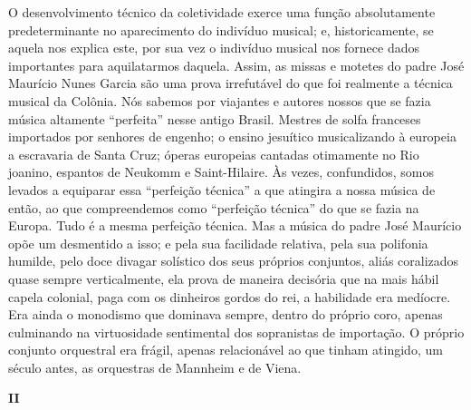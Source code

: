O desenvolvimento técnico da coletividade exerce uma função
absolutamente predeterminante no aparecimento do indivíduo musical; e,
historicamente, se aquela nos explica este, por sua vez o indivíduo
musical nos fornece dados importantes para aquilatarmos daquela. Assim,
as missas e motetes do padre José Maurício Nunes Garcia são uma prova
irrefutável do que foi realmente a técnica musical da Colônia. Nós
sabemos por viajantes e autores nossos que se fazia música altamente
``perfeita'' nesse antigo Brasil. Mestres de solfa franceses importados
por senhores de engenho; o ensino jesuítico musicalizando à europeia a
escravaria de Santa Cruz; óperas europeias cantadas otimamente no Rio
joanino, espantos de Neukomm e Saint-Hilaire. Às vezes, confundidos,
somos levados a equiparar essa ``perfeição técnica'' a que atingira a
nossa música de então, ao que compreendemos como ``perfeição técnica''
do que se fazia na Europa. Tudo é a mesma perfeição técnica. Mas a
música do padre José Maurício opõe um desmentido a isso; e pela sua
facilidade relativa, pela sua polifonia humilde, pelo doce divagar
solístico dos seus próprios conjuntos, aliás coralizados quase sempre
verticalmente, ela prova de maneira decisória que na mais hábil capela
colonial, paga com os dinheiros gordos do rei, a habilidade era
medíocre. Era ainda o monodismo que dominava sempre, dentro do próprio
coro, apenas culminando na virtuosidade sentimental dos sopranistas de
importação. O próprio conjunto orquestral era frágil, apenas
relacionável ao que tinham atingido, um século antes, as orquestras de
Mannheim e de Viena.

\textbf{II}

